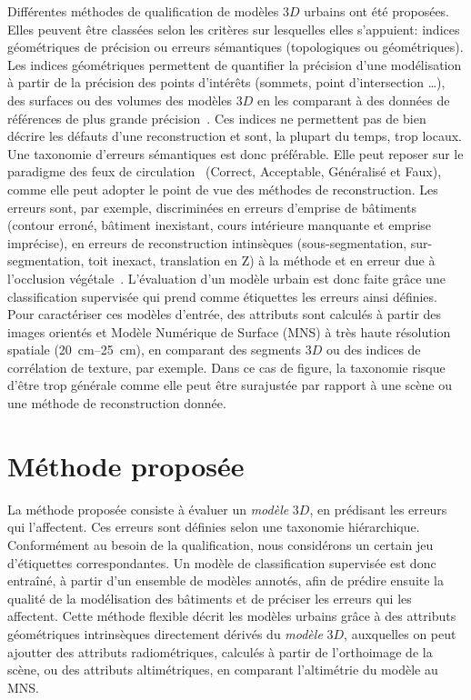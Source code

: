 \documentclass[a4paper,french]{article}
\begin{document}
    Différentes méthodes de qualification de modèles $3D$ urbains ont été proposées. Elles peuvent être classées selon les critères sur lesquelles elles s'appuient: indices géométriques de précision ou erreurs sémantiques (topologiques ou géométriques). Les indices géométriques permettent de quantifier la précision d'une modélisation à partir de la précision des points d'intérêts (sommets, point d'intersection \dots), des surfaces ou des volumes des modèles $3D$ en les comparant à des données de références de plus grande précision~\cite{Zeng2014}. Ces indices ne permettent pas de bien décrire les défauts d'une reconstruction et sont, la plupart du temps, trop locaux. Une taxonomie d'erreurs sémantiques est donc préférable. Elle peut reposer sur le paradigme des feux de circulation~\cite{boudet2006supervised} (Correct, Acceptable, Généralisé et Faux), comme elle peut adopter le point de vue des méthodes de reconstruction. Les erreurs sont, par exemple, discriminées en erreurs d'emprise de bâtiments (contour erroné, bâtiment inexistant, cours intérieure manquante et emprise imprécise), en erreurs de reconstruction intinsèques (sous-segmentation, sur-segmentation, toit inexact, translation en Z) à la méthode et en erreur due à l'occlusion végétale~\cite{Michelin2013}. L'évaluation d'un modèle urbain est donc faite grâce une classification supervisée qui prend comme étiquettes les erreurs ainsi définies. Pour caractériser ces modèles d'entrée, des attributs sont calculés à partir des images orientés et Modèle Numérique de Surface (MNS) à très haute résolution spatiale (\SIrange{20}{25}{\cm}), en comparant des segments $3D$ ou des indices de corrélation de texture, par exemple. Dans ce cas de figure, la taxonomie risque d'être trop générale comme elle peut être surajustée par rapport à une scène ou une méthode de reconstruction donnée.

    \section{Méthode proposée}

    La méthode proposée consiste à évaluer un \textit{modèle} $3D$, en prédisant les erreurs qui l'affectent. Ces erreurs sont définies selon une taxonomie hiérarchique. Conformément au besoin de la qualification, nous considérons un certain jeu d'étiquettes correspondantes. Un modèle de classification supervisée est donc entraîné, à partir d'un ensemble de modèles annotés, afin de prédire ensuite la qualité de la modélisation des bâtiments et de préciser les erreurs qui les affectent. Cette méthode flexible décrit les modèles urbains grâce à des attributs géométriques intrinsèques directement dérivés du \textit{modèle} $3D$, auxquelles on peut ajoutter des attributs radiométriques, calculés à partir de l'orthoimage de la scène, ou des attributs altimétriques, en comparant l'altimétrie du modèle au MNS.
\end{document}
